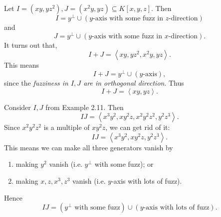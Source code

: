 \documentclass[co439]{subfiles}
\begin{document}
    \begin{example}{}
        Let $I = \left( xy,yz^{2} \right), J = \left( x^{2}y,yz \right)\subseteq K\left[ x,y,z \right]$. Then
        \begin{equation*}
            I = y^{\perp}\cup\left( \text{$y$-axis with some fuzz in $z$-direction} \right)
        \end{equation*}
        and
        \begin{equation*}
            J = y^{\perp}\cup\left( \text{$y$-axis with some fuzz in $x$-direction} \right).
        \end{equation*}
        It turns out that,
        \begin{equation*}
            I+J = \left< xy,yz^{2},x^{2}y,yz \right>. 
        \end{equation*}
        This means
        \begin{equation*}
            I+J = y^{\perp}\cup\left( \text{$y$-axis} \right),
        \end{equation*}
        since the \textit{fuzziness in $I,J$ are in orthogonal direction}. Thus
        \begin{equation*}
            I+J = \left< xy,yz \right> .
        \end{equation*}
    \end{example}
    
    \rruleline

    \begin{example}{}
        Consider $I,J$ from Example 2.11. Then
        \begin{equation*}
            IJ = \left< x^{3}y^{2}, xy^{2}z, x^{2}y^{2}z^{2}, y^{2}z^{3} \right> .
        \end{equation*}
        Since $x^{2}y^{2}z^{2}$ is a multiple of $xy^{2}z$, we can get rid of it:
        \begin{equation*}
            IJ = \left< x^{3}y^{2}, xy^{2}z, y^{2}z^{3} \right>. 
        \end{equation*}
        This means we can make all three generators vanish by
        \begin{enumerate}
            \item making $y^{2}$ vanish (i.e. $y^{\perp}$ with some fuzz); or
            \item making $x,z,x^{3},z^{3}$ vanish (i.e. $y$-axis with lots of fuzz).
        \end{enumerate}
        Hence
        \begin{equation*}
            IJ = \left( \text{$y^{\perp}$ with some fuzz} \right) \cup \left( \text{$y$-axis with lots of fuzz} \right).
        \end{equation*}
    \end{example}
    
\end{document}
